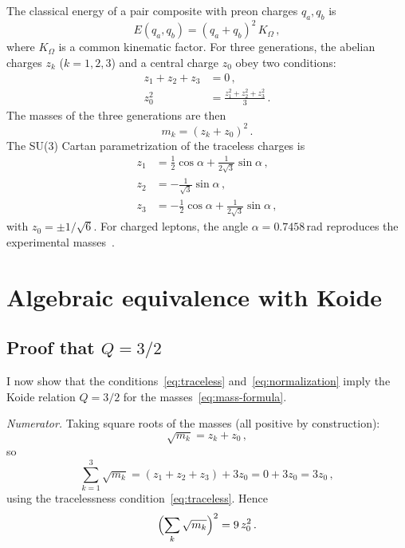 \documentclass[prd,twocolumn,superscriptaddress,nofootinbib]{revtex4-2}
\begin{document}
The classical energy of a pair composite with preon charges $q_a,q_b$ is
\begin{equation}
  E(q_a,q_b) = (q_a + q_b)^2\,K_\Omega\,,
  \label{eq:pair-energy}
\end{equation}
where $K_\Omega$ is a common kinematic factor.  For three generations,
the abelian charges $z_k$ ($k=1,2,3$) and a central charge $z_0$ obey
two conditions:
\begin{align}
  z_1 + z_2 + z_3 &= 0\,, \label{eq:traceless}\\
  z_0^2 &= \frac{z_1^2+z_2^2+z_3^2}{3}\,. \label{eq:normalization}
\end{align}
The masses of the three generations are then
\begin{equation}
  m_k = (z_k + z_0)^2\,.
  \label{eq:mass-formula}
\end{equation}
The SU(3) Cartan parametrization of the traceless charges is
\begin{align}
  z_1 &= \tfrac{1}{2}\cos\alpha
        + \tfrac{1}{2\sqrt{3}}\sin\alpha\,,\nonumber\\
  z_2 &= -\tfrac{1}{\sqrt{3}}\sin\alpha\,,\label{eq:cartan-param}\\
  z_3 &= -\tfrac{1}{2}\cos\alpha
        + \tfrac{1}{2\sqrt{3}}\sin\alpha\,,\nonumber
\end{align}
with $z_0 = \pm 1/\sqrt{6}$.  For charged leptons, the angle
$\alpha=0.7458$\,rad reproduces the experimental
masses~\cite{Rivero2024so32}.

\section{Algebraic equivalence with Koide}
\label{sec:equivalence}

\subsection{Proof that $Q=3/2$}
\label{sec:proof}

I now show that the conditions~\eqref{eq:traceless}
and~\eqref{eq:normalization} imply the Koide relation $Q=3/2$ for the
masses~\eqref{eq:mass-formula}.

\medskip\noindent\textit{Numerator.}\quad
Taking square roots of the masses (all positive by construction):
\begin{equation}
  \sqrt{m_k} = z_k + z_0\,,
\end{equation}
so
\begin{equation}
  \sum_{k=1}^3 \sqrt{m_k}
  = (z_1+z_2+z_3) + 3z_0
  = 0 + 3z_0
  = 3z_0\,,
  \label{eq:numerator-step}
\end{equation}
using the tracelessness condition~\eqref{eq:traceless}.  Hence
\begin{equation}
  \Bigl(\sum_k\sqrt{m_k}\Bigr)^2 = 9\,z_0^2\,.
  \label{eq:numerator}
\end{equation}
\end{document}
